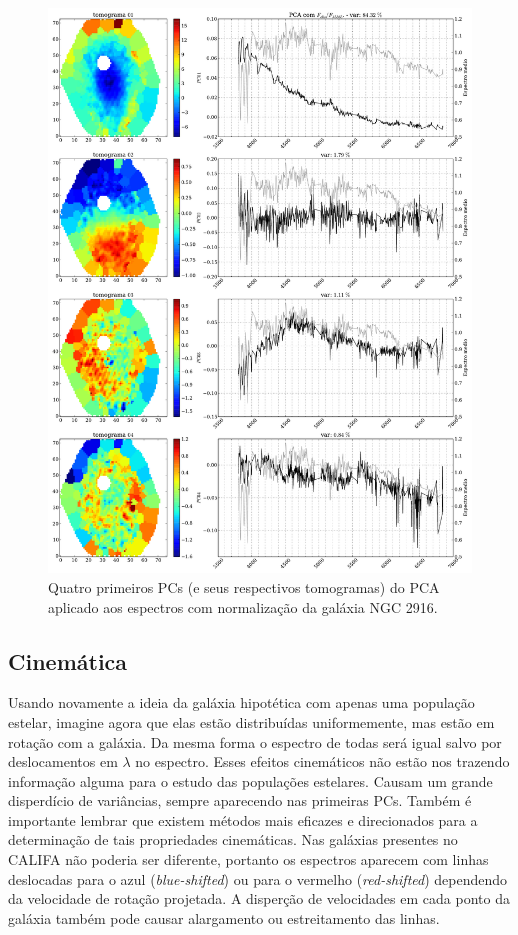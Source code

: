\begin{figure}
    \includegraphics[width=1.\textwidth]{figuras/K0277-tomo1a4-norm.pdf}
    \caption[Tomogramas de 1 a 4 da gal\'axia NGC 2916 - $F_{obs} / F_{\lambda 5365}$.]
    {Quatro primeiros PCs (e seus respectivos tomogramas) do PCA aplicado aos espectros com normalização da galáxia
    NGC 2916.}
    \label{fig:UsoPCA:K277tomofobsnorm}
\end{figure}

\subsection{Cinemática}

Usando novamente a ideia da galáxia hipotética com apenas uma população estelar, imagine agora que elas estão
distribuídas uniformemente, mas estão em rotação com a galáxia. Da mesma forma o espectro de todas será igual salvo por
deslocamentos em $\lambda$ no espectro. Esses efeitos cinemáticos não estão nos trazendo informação alguma para o estudo
das populações estelares. Causam um grande disperdício de variâncias, sempre aparecendo nas primeiras PCs. Também é
importante lembrar que existem métodos mais eficazes e direcionados para a determinação de tais propriedades
cinemáticas. Nas galáxias presentes no CALIFA não poderia ser diferente, portanto os espectros aparecem com linhas
deslocadas para o azul ({\em blue-shifted}) ou para o vermelho ({\em red-shifted}) dependendo da velocidade de rotação
projetada. A disperção de velocidades em cada ponto da galáxia também pode causar alargamento ou estreitamento das
linhas.

